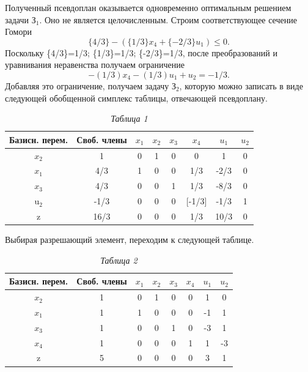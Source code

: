 Полученный псевдоплан оказывается одновременно оптимальным решением задачи З$_1$. Оно не является целочисленным. Строим соответствующее сечение Гомори
$$
\{4/3\}-(\{1/3\}x_4+\{-2/3\}u_1)\leq0.
$$
Поскольку \{4/3\}=1/3; \{1/3\}=1/3; \{-2/3\}=1/3, после преобразований и уравнивания неравенства получаем ограничение
$$
-(1/3)x_4-(1/3)u_1+u_2=-1/3.
$$
Добавляя это ограничение, получаем задачу З$_2$, которую можно записать в виде следующей обобщенной симплекс таблицы, отвечающей псевдоплану.

\begin{table}[h]
\label{table_5_11}
\caption*{\hspace{0.8\linewidth} \textit{Таблица 1}}
\centering
\begin{tabular}{|c|*{7}{c|}}
\hline
\parbox{1.6cm}{\centering Базисн. перем.}& \parbox{1.6cm}{\centering Своб. члены} & \parbox{0.8cm}{\centering $x_1$} & \parbox{0.8cm}{\centering $x_2$} & \parbox{0.8cm}{\centering $x_3$} & \parbox{0.8cm}{\centering $x_4$} & \parbox{0.8cm}{\centering $u_1$} & \parbox{0.8cm}{\centering $u_2$}\\
\hline
$x_2$ & 1 & 0 & 1 & 0 & 0 & 1 & 0\\
\hline
$x_1 $ & 4/3 & 1 & 0 & 0 & 1/3 & -2/3 & 0 \\
\hline
$x_3 $ & 4/3 & 0 & 0 & 1 & 1/3 & -8/3 & 0 \\
\hline
{}u$_2$ & -1/3 & 0 & 0 &0 &[-1/3] & -1/3 &1\\
\hline
z & 16/3 & 0 & 0 & 0 & 1/3 & 10/3& 0\\
\hline
\end{tabular}
\end{table}

Выбирая разрешающий элемент, переходим к следующей таблице.
\newpage
\begin{table}[h]
\label{table_5_12}
\caption*{\hspace{0.8\linewidth} \textit{Таблица 2}}
\centering
\begin{tabular}{|c|*{7}{c|}}
\hline
\parbox{1.6cm}{\centering Базисн. перем.}& \parbox{1.6cm}{\centering Своб. члены} & \parbox{0.8cm}{\centering $x_1$} & \parbox{0.8cm}{\centering $x_2$} & \parbox{0.8cm}{\centering $x_3$} & \parbox{0.8cm}{\centering $x_4$} & \parbox{0.8cm}{\centering $u_1$} & \parbox{0.8cm}{\centering $u_2$}\\
\hline
$x_2$ & 1 & 0 & 1 & 0 & 0 & 1 & 0 \\
\hline
$x_1 $ & 1 & 1 & 0 & 0 & 0 & -1 & 1 \\
\hline
$x_3 $ & 1 & 0 & 0 & 1 & 0 & -3 & 1 \\
\hline
$x_4$ & 1 & 0 & 0 & 0 & 1 & 1 & -3 \\
\hline
z & 5 & 0 & 0 & 0 & 0 & 3 & 1\\
\hline
\end{tabular}
\end{table}


